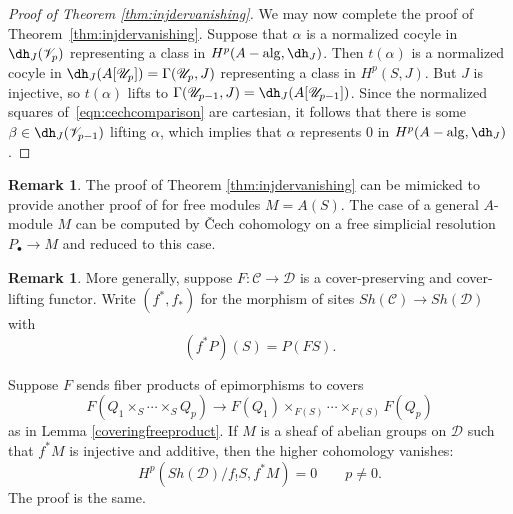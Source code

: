\documentclass[11pt,reqno]{amsart}
\theoremstyle{definition}
\newtheorem{remark}[theorem]{Remark}
\newcommand{\dd}[1]{\dh_{#1}}
\newcommand{\cal}[1]{\ensuremath{\mathcal{#1}}}
\newcommand{\Aalg}{A-{\rm alg}}
\begin{document}
\begin{proof}[Proof of Theorem \ref{thm:injdervanishing}]
We may now complete the proof of Theorem~\ref{thm:injdervanishing}.  Suppose that $\alpha$ is a normalized cocyle in $\dd J(\mathscr V_p)$ representing a class in $H^p(\Aalg, \dd J)$.  Then $t(\alpha)$ is a normalized cocyle in $\dd J(A[\mathscr U_p]) = \Gamma(\mathscr U_p, J)$ representing a class in $H^p(S, J)$.  But $J$ is injective, so $t(\alpha)$ lifts to $\Gamma(\mathscr U_{p-1}, J) = \dd J(A[\mathscr U_{p-1}])$.  Since the normalized squares of~\eqref{eqn:cechcomparison} are cartesian, it follows that there is some $\beta \in \dd J(\mathscr V_{p-1})$ lifting $\alpha$, which implies that $\alpha$ represents $0$ in $H^p(\Aalg, \dd J)$.

\end{proof}






\begin{remark}

The proof of Theorem \ref{thm:injdervanishing} can be mimicked to provide another proof of \cite[Theorem 1.5]{mymoduledefms} for free modules $M = A(S)$. The case of a general $A$-module $M$ can be computed by \v Cech cohomology on a free simplicial resolution $P_\bullet \to M$ and reduced to this case. 

\end{remark}

\begin{remark}

More generally, suppose $F : \cal C \to \cal D$ is a cover-preserving and cover-lifting functor. Write $(f^*, f_*)$ for the morphism of sites $Sh(\cal C) \to Sh(\cal D)$ with
\[(f^* P)(S) = P(FS).\]

Suppose $F$ sends fiber products of epimorphisms to covers
\[F(Q_1 \times_S \cdots \times_S Q_p) \longrightarrow F(Q_1) \times_{F(S)} \cdots \times_{F(S)} F(Q_p)\]
as in Lemma \ref{coveringfreeproduct}. If $M$ is a sheaf of abelian groups on $\cal D$ such that $f^* M$ is injective and additive, then the higher cohomology vanishes:
\[H^p(Sh(\cal D)/f_! S, f^* M) = 0 \qquad p \neq 0.\]
The proof is the same. 


\end{remark}




















\end{document}
